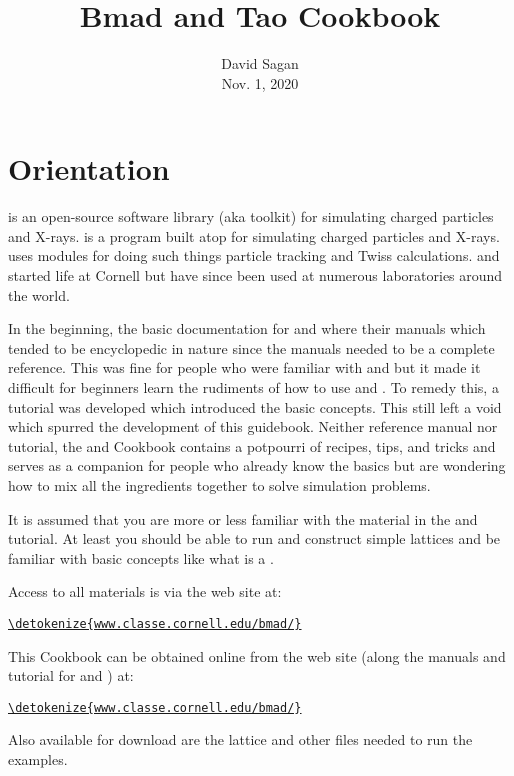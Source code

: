 \documentclass{hitec}     %
\title{Bmad and Tao Cookbook}
\author{}
\date{David Sagan \\ Nov. 1, 2020}
\newcommand{\Section}[1]{\section{#1}\vspace*{-1ex}}
\newenvironment{display}
  {\vspace*{-1.5ex} \begin{alltt}}
  {\end{alltt} \vspace*{-1.0ex}}
\begin{document}
\maketitle

\cleardoublepage
{}
{}
\tableofcontents

\newpage

\Section{Orientation}
\label{s:orient}

\bmad is an open-source software library (aka toolkit) for simulating charged particles and X-rays.
\tao is a program built atop \bmad for simulating charged particles and X-rays. \tao uses \bmad
modules for doing such things particle tracking and Twiss calculations. \tao and \bmad started life
at Cornell but have since been used at numerous laboratories around the world.

In the beginning, the basic documentation for \bmad and \tao where their manuals which tended to be
encyclopedic in nature since the manuals needed to be a complete reference. This was fine for people
who were familiar with \bmad and \tao but it made it difficult for beginners learn the rudiments of
how to use \bmad and \tao. To remedy this, a tutorial was developed which introduced the basic
concepts. This still left a void which spurred the development of this guidebook. Neither reference
manual nor tutorial, the \bmad and \tao Cookbook contains a potpourri of recipes, tips, and tricks
and serves as a companion for people who already know the basics but are wondering how to mix all
the ingredients together to solve simulation problems.

It is assumed that you are more or less familiar with the material in the \bmad and \tao
tutorial. At least you should be able to run \tao and construct simple lattices and be familiar with
basic concepts like what is a . 

Access to all materials is via the \bmad web site at:
\begin{display}
  \url{\detokenize{www.classe.cornell.edu/bmad/}}
\end{display}

This Cookbook can be obtained online from the \bmad web site (along the manuals and tutorial for
\bmad and \tao) at:
\begin{display}
  \url{\detokenize{www.classe.cornell.edu/bmad/}}
\end{display}
Also available for download are the lattice and other files needed to run the examples.
\end{document}
